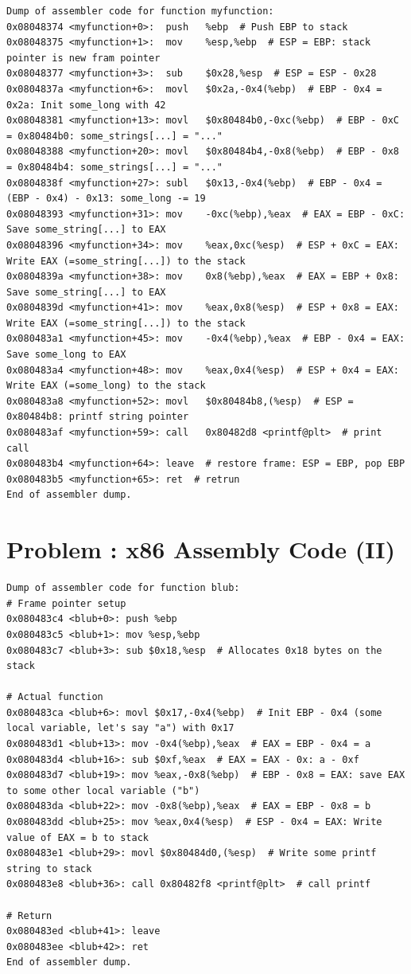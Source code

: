 \documentclass[12pt]{scrartcl}
\newcounter{exnum}
\newcommand{\exercise}[1]{\section*{Problem \theexnum\stepcounter{exnum}: #1}}
\begin{document}
\begin{lstlisting}[language={}, caption=Assembler code for myfunction]
Dump of assembler code for function myfunction:
0x08048374 <myfunction+0>:	push   %ebp  # Push EBP to stack
0x08048375 <myfunction+1>:	mov    %esp,%ebp  # ESP = EBP: stack pointer is new fram pointer
0x08048377 <myfunction+3>:	sub    $0x28,%esp  # ESP = ESP - 0x28 
0x0804837a <myfunction+6>:	movl   $0x2a,-0x4(%ebp)  # EBP - 0x4 = 0x2a: Init some_long with 42
0x08048381 <myfunction+13>:	movl   $0x80484b0,-0xc(%ebp)  # EBP - 0xC = 0x80484b0: some_strings[...] = "..."
0x08048388 <myfunction+20>:	movl   $0x80484b4,-0x8(%ebp)  # EBP - 0x8 = 0x80484b4: some_strings[...] = "..."
0x0804838f <myfunction+27>:	subl   $0x13,-0x4(%ebp)  # EBP - 0x4 = (EBP - 0x4) - 0x13: some_long -= 19
0x08048393 <myfunction+31>:	mov    -0xc(%ebp),%eax  # EAX = EBP - 0xC: Save some_string[...] to EAX
0x08048396 <myfunction+34>:	mov    %eax,0xc(%esp)  # ESP + 0xC = EAX: Write EAX (=some_string[...]) to the stack
0x0804839a <myfunction+38>:	mov    0x8(%ebp),%eax  # EAX = EBP + 0x8: Save some_string[...] to EAX
0x0804839d <myfunction+41>:	mov    %eax,0x8(%esp)  # ESP + 0x8 = EAX: Write EAX (=some_string[...]) to the stack
0x080483a1 <myfunction+45>:	mov    -0x4(%ebp),%eax  # EBP - 0x4 = EAX: Save some_long to EAX
0x080483a4 <myfunction+48>:	mov    %eax,0x4(%esp)  # ESP + 0x4 = EAX: Write EAX (=some_long) to the stack
0x080483a8 <myfunction+52>:	movl   $0x80484b8,(%esp)  # ESP = 0x80484b8: printf string pointer
0x080483af <myfunction+59>:	call   0x80482d8 <printf@plt>  # print call
0x080483b4 <myfunction+64>:	leave  # restore frame: ESP = EBP, pop EBP
0x080483b5 <myfunction+65>:	ret  # retrun
End of assembler dump.
\end{lstlisting}

\exercise{x86 Assembly Code (II)}

\begin{lstlisting}[language={}]
Dump of assembler code for function blub:
# Frame pointer setup
0x080483c4 <blub+0>: push %ebp
0x080483c5 <blub+1>: mov %esp,%ebp
0x080483c7 <blub+3>: sub $0x18,%esp  # Allocates 0x18 bytes on the stack

# Actual function
0x080483ca <blub+6>: movl $0x17,-0x4(%ebp)  # Init EBP - 0x4 (some local variable, let's say "a") with 0x17
0x080483d1 <blub+13>: mov -0x4(%ebp),%eax  # EAX = EBP - 0x4 = a
0x080483d4 <blub+16>: sub $0xf,%eax  # EAX = EAX - 0x: a - 0xf
0x080483d7 <blub+19>: mov %eax,-0x8(%ebp)  # EBP - 0x8 = EAX: save EAX to some other local variable ("b")
0x080483da <blub+22>: mov -0x8(%ebp),%eax  # EAX = EBP - 0x8 = b
0x080483dd <blub+25>: mov %eax,0x4(%esp)  # ESP - 0x4 = EAX: Write value of EAX = b to stack
0x080483e1 <blub+29>: movl $0x80484d0,(%esp)  # Write some printf string to stack
0x080483e8 <blub+36>: call 0x80482f8 <printf@plt>  # call printf

# Return
0x080483ed <blub+41>: leave
0x080483ee <blub+42>: ret
End of assembler dump.
\end{lstlisting}
\end{document}
